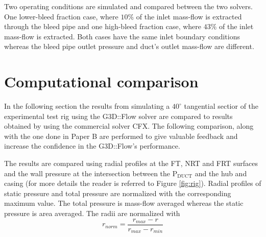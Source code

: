 Two operating conditions are simulated and compared between the two solvers. One lower-bleed fraction case, where $10\%$ of the inlet mass-flow is extracted through the bleed pipe and one high-bleed fraction case, where $43\%$ of the inlet mass-flow is extracted. Both cases have the same inlet boundary conditions whereas the bleed pipe outlet pressure and duct's outlet mass-flow are different.


\section{Computational comparison}
In the following section the results from simulating a $40^\circ$ tangential sectior of the experimental test rig using the G3D::Flow solver are compared to results obtained by using the commercial solver CFX. The following comparison, along with the one done in Paper B are performed to give valuable feedback and increase the confidence in the G3D::Flow's performance.

The results are compared using radial profiles at the FT, NRT and FRT surfaces and the wall pressure at the intersection between the P$_\text{DUCT}$ and the hub and casing (for more details the reader is referred to Figure \ref{fig:rig}). Radial profiles of static pressure and total pressure are normalized with the corresponding maximum value. The total pressure is mass-flow averaged whereas the static pressure is area averaged. The radii are normalized with 
\begin{equation*}
  r_{norm} = \frac{r_{max}-r}{r_{max}-r_{min}}
\end{equation*}

